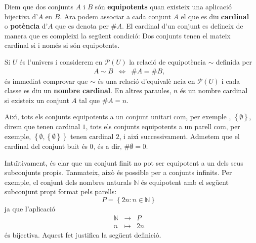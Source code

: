 \bigskip

Diem que dos conjunts $A$ i $B$ s\'{o}n \textbf{equipotents} quan existeix
una aplicaci\'{o} bijectiva d'$A$ en $B$. Ara podem associar a cada conjunt $%
A$ el que es diu \textbf{cardinal} o \textbf{pot\`{e}ncia} d'$A$ que es
denota per $\#A$. El cardinal d'un conjunt es defineix de manera que es
compleixi la seg\"{u}ent condici\'{o}: Dos conjunts tenen el mateix cardinal
si i nom\'{e}s si s\'{o}n equipotents.

\bigskip

Si $U$ \'{e}s l'univers i considerem en $\mathcal{P}(U)$ la relaci\'{o} de
equipot\`{e}ncia $\sim$ definida per%
\begin{equation*}
\begin{array}{ccc}
A\sim B & \Longleftrightarrow & \#A=\#B\text{,}%
\end{array}
\end{equation*}
\'{e}s immediat comprovar que $\sim$ \'{e}s una relaci\'{o} d'equival\`{e}%
ncia en $\mathcal{P}(U)$ i cada classe es diu un \textbf{nombre cardinal}.
En altres paraules, $n$ \'{e}s un nombre cardinal si existeix un conjunt $A$
tal que $\#A=n$.

\bigskip

Aix\'{\i}, tots els conjunts equipotents a un conjunt unitari com, per
exemple , $\left\{ \emptyset\right\} $, direm que tenen cardinal $1$, tots
els conjunts equipotents a un parell com, per exemple, $\left\{ \emptyset
,\left\{ \emptyset\right\} \right\} $ tenen cardinal $2$, i aix\'{\i}
successivament. Admetem que el cardinal del conjunt buit \'{e}s $0$, \'{e}s
a dir, $\#\emptyset=0$.

\bigskip

Intu\"{\i}tivament, \'{e}s clar que un conjunt finit no pot ser equipotent a
un dels seus subconjunts propis. Tanmateix, aix\`{o} \'{e}s possible per a
conjunts infinits. Per exemple, el conjunt dels nombres naturals $\mathbb{N}$
\'{e}s equipotent amb el seg\"{u}ent subconjunt propi format pels parells:
\begin{equation*}
P=\left\{ 2n:n\in\mathbb{N}\right\}
\end{equation*}
ja que l'aplicaci\'{o}%
\begin{equation*}
\begin{array}{ccc}
\mathbb{N} & \longrightarrow & P \\
n & \longmapsto & 2n%
\end{array}
\end{equation*}
\'{e}s bijectiva. Aquest fet justifica la seg\"{u}ent definici\'{o}.

